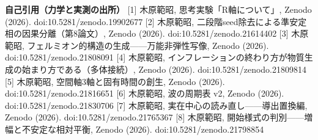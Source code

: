 \documentclass[
]{ltjarticle}
\begin{document}
\textbf{自己引用（力学と実測の出所）} {[}1{]} 木原範昭,
思考実験「R軸について」, Zenodo (2026). doi:10.5281/zenodo.19902677
{[}2{]} 木原範昭, 二段階seed除去による準安定相の因果分離（第8論文）,
Zenodo (2026). doi:10.5281/zenodo.21614402 {[}3{]} 木原範昭,
フェルミオン的構造の生成------万能非弾性写像, Zenodo (2026).
doi:10.5281/zenodo.21808091 {[}4{]} 木原範昭,
インフレーションの終わり方が物質生成の始まり方である（多体接続）, Zenodo
(2026). doi:10.5281/zenodo.21809814 {[}5{]} 木原範昭,
空間軸3軸と固有時間の創生, Zenodo (2026). doi:10.5281/zenodo.21816651
{[}6{]} 木原範昭, 波の周期表 v2, Zenodo (2026).
doi:10.5281/zenodo.21830706 {[}7{]} 木原範昭,
実在中心の読み直し------導出置換編, Zenodo (2026).
doi:10.5281/zenodo.21765367 {[}8{]} 木原範昭,
開始様式の判別------増幅と不安定な相対平衡, Zenodo (2026).
doi:10.5281/zenodo.21798854
\end{document}
